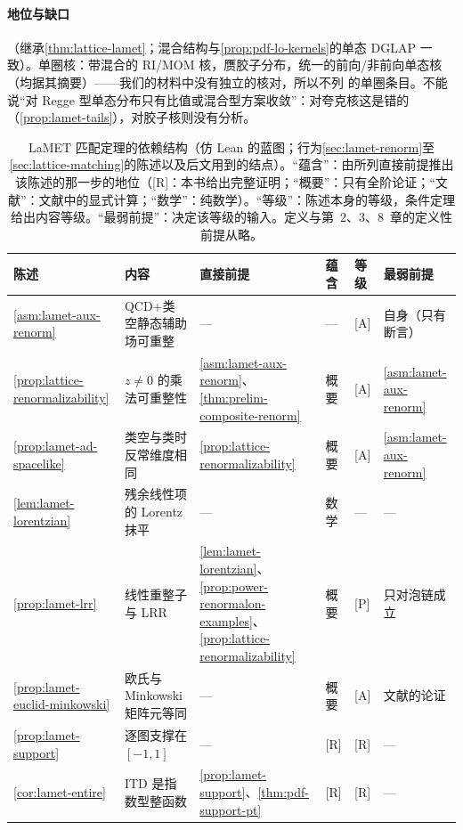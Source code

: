 \paragraph{地位与缺口}
\tagA（继承\cref{thm:lattice-lamet}；混合结构与\cref{prop:pdf-lo-kernels}的单态 DGLAP 一致）。单圈核：带混合的 RI/MOM 核\cite{Wang:2019tgg}，赝胶子分布\cite{Balitsky:2019krf}，统一的前向/非前向单态核\cite{Yao:2022vtp}（均据其摘要）——我们的材料中没有独立的核对，所以不列 \tagR 的单圈条目。不能说“对 Regge 型单态分布只有比值或混合型方案收敛”：对夸克核这是错的（\cref{prop:lamet-tails}），对胶子核则没有分析。

\begin{table}[htbp]
\centering
\footnotesize
\renewcommand{\arraystretch}{1.1}
\caption{LaMET 匹配定理的依赖结构（仿 Lean 的蓝图；行为\cref{sec:lamet-renorm}至\cref{sec:lattice-matching}的陈述以及后文用到的结点）。“蕴含”：由所列直接前提推出该陈述的那一步的地位（[R]：本书给出完整证明；“概要”：只有全阶论证；“文献”：文献中的显式计算；“数学”：纯数学）。“等级”：陈述本身的等级，条件定理给出内容等级。“最弱前提”：决定该等级的输入。定义与第~2、3、8~章的定义性前提从略。}
\label{tab:lamet-dependency}
\begin{tabularx}{\textwidth}{@{}p{1.75cm}Xp{3.85cm}p{0.95cm}p{1.15cm}p{2.45cm}@{}}
\toprule
陈述 & 内容 & 直接前提 & 蕴含 & 等级 & 最弱前提 \\
\midrule
\cref{asm:lamet-aux-renorm} & QCD$+$类空静态辅助场可重整 & — & — & [A] & 自身（只有断言） \\
\cref{prop:lattice-renormalizability} & $z\neq0$ 的乘法可重整性 & \cref{asm:lamet-aux-renorm}、\cref{thm:prelim-composite-renorm} & 概要 & [A] & \cref{asm:lamet-aux-renorm} \\
\cref{prop:lamet-ad-spacelike} & 类空与类时反常维度相同 & \cref{prop:lattice-renormalizability} & 概要 & [A] & \cref{asm:lamet-aux-renorm} \\
\cref{lem:lamet-lorentzian} & 残余线性项的 Lorentz 抹平 & — & 数学 & — & — \\
\cref{prop:lamet-lrr} & 线性重整子与 LRR & \cref{lem:lamet-lorentzian}、\cref{prop:power-renormalon-examples}、\cref{prop:lattice-renormalizability} & 概要 & [P] & 只对泡链成立 \\
\cref{prop:lamet-euclid-minkowski} & 欧氏与 Minkowski 矩阵元等同 & — & 概要 & [A] & 文献的论证 \\
\cref{prop:lamet-support} & 逐图支撑在 $[-1,1]$ & — & [R] & [R] & — \\
\cref{cor:lamet-entire} & ITD 是指数型整函数 & \cref{prop:lamet-support}、\cref{thm:pdf-support-pt} & [R] & [R] & — \\

\end{tabularx}
\end{table}
